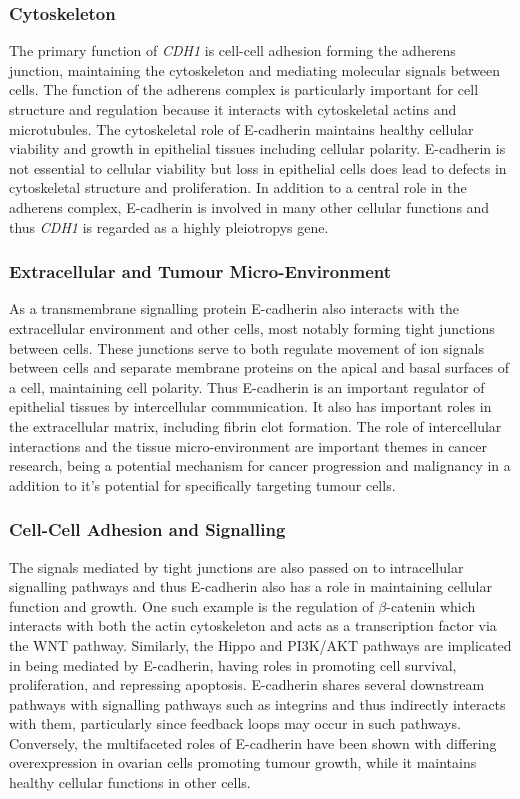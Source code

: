 \subsubsection{Cytoskeleton}
The primary function of \textit{CDH1} is cell-cell adhesion forming the adherens junction, maintaining the cytoskeleton and mediating molecular signals between cells. The function of the adherens complex is particularly important for cell structure and regulation because it interacts with cytoskeletal actins and microtubules. The cytoskeletal role of \gls{E-cadherin} maintains healthy cellular viability and growth in epithelial tissues including cellular polarity. \gls{E-cadherin} is not essential to cellular viability but loss in epithelial cells does lead to defects in cytoskeletal structure and proliferation. In addition to a central role in the adherens complex, \gls{E-cadherin} is involved in many other cellular functions and thus \textit{CDH1} is regarded as a highly \glspl{pleiotropy} gene.

\subsubsection{Extracellular and Tumour Micro-Environment}
As a transmembrane signalling protein \gls{E-cadherin} also interacts with the extracellular environment and other cells, most notably forming tight junctions between cells. These junctions serve to both regulate movement of ion signals between cells and separate membrane proteins on the apical and basal surfaces of a cell, maintaining cell polarity. Thus \gls{E-cadherin} is an important regulator of epithelial tissues by intercellular communication. It also has important roles in the extracellular matrix, including fibrin clot formation. The role of intercellular interactions and the tissue micro-environment are important themes in cancer research, being a potential mechanism for cancer progression and malignancy in a addition to it's potential for specifically targeting tumour cells.

\subsubsection{Cell-Cell Adhesion and Signalling}
The signals mediated by tight junctions are also passed on to intracellular signalling pathways and thus \gls{E-cadherin} also has a role in maintaining cellular function and growth. One such example is the regulation of $\beta$-catenin which interacts with both the actin cytoskeleton and acts as a transcription factor via the WNT pathway. Similarly, the Hippo and PI3K/AKT pathways are implicated in being mediated by \gls{E-cadherin}, having roles in promoting cell survival, proliferation, and repressing apoptosis. \gls{E-cadherin} shares several downstream pathways with signalling pathways such as integrins and thus indirectly interacts with them, particularly since feedback loops may occur in such pathways. Conversely, the multifaceted roles of \gls{E-cadherin} have been shown with differing overexpression in ovarian cells promoting tumour growth, while it maintains healthy cellular functions in other cells.

